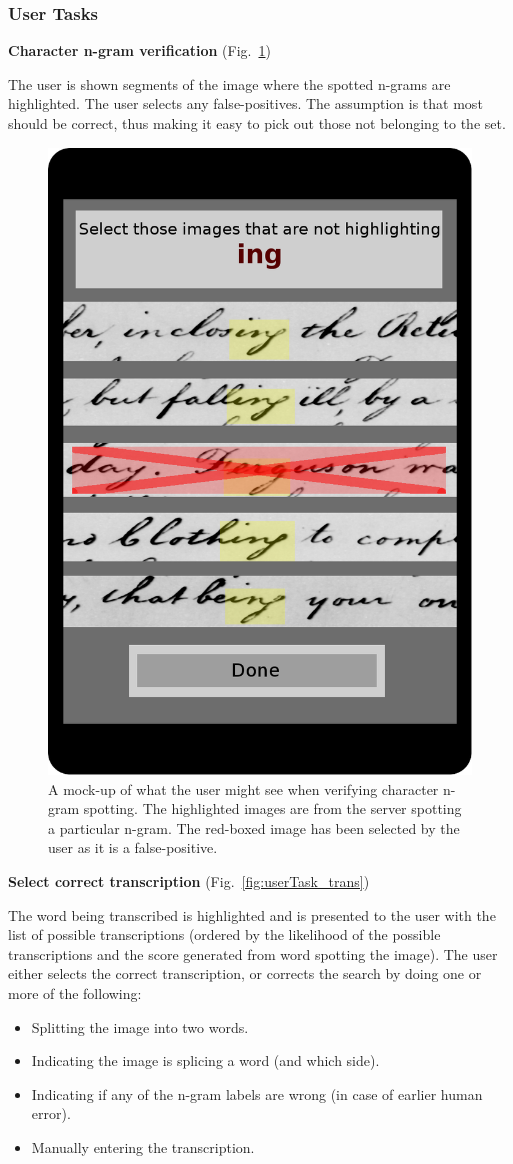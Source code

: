 \documentclass[ms]{byuprop}
\begin{document}
\subsubsection{User Tasks}





{\setlength{\parindent}{0cm}
\textbf{Character n-gram verification} (Fig.~\ref{fig:userTask_spot})

\begin{addmargin}[3em]{3em}
The user is shown segments of the image where the spotted n-grams are highlighted. The user selects any false-positives. The assumption is that most should be correct, thus making it easy to pick out those not belonging to the set.
\\[.5cm]
\end{addmargin}

\begin{figure}
    \centering
    \includegraphics[width=.4\textwidth]{userTask_spot}
    \caption{A mock-up of what the user might see when verifying character n-gram spotting. The highlighted images are from the server spotting a particular n-gram. The red-boxed image has been selected by the user as it is a false-positive.}
    \label{fig:userTask_spot}
\end{figure}

\textbf{Select correct transcription} (Fig.~\ref{fig:userTask_trans})

\begin{addmargin}[3em]{3em}
The word being transcribed is highlighted and is presented to the user with the list of possible transcriptions (ordered by the likelihood of the possible transcriptions and the score generated from word spotting the image). The user either selects the correct transcription, or corrects the search by doing one or more of the following:
\begin{itemize}
    \item Splitting the image into two words.
    \item Indicating the image is splicing a word (and which side).
    \item Indicating if any of the n-gram labels are wrong (in case of earlier human error).
    \item Manually entering the transcription.
\end{itemize}

\end{addmargin}
}
\end{document}
